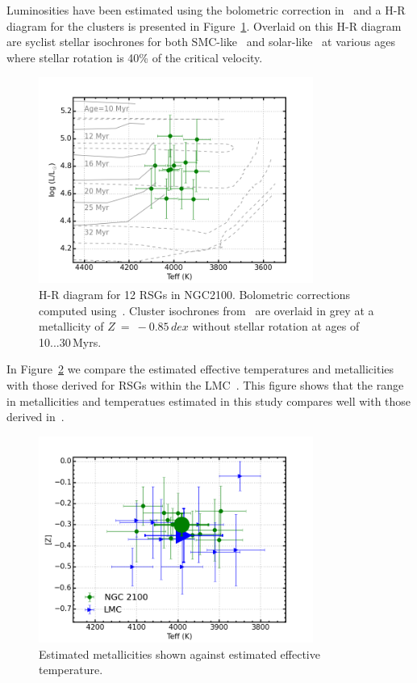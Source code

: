 \documentclass[useAMS,usenatbib]{mn2e}
\begin{document}
Luminosities have been estimated using the bolometric correction in~\cite{2013ApJ...767....3D} and a H-R diagram for the clusters is presented in Figure~\ref{fig:HRD}.
Overlaid on this H-R diagram are {\sc syclist} stellar isochrones for both SMC-like~\citep[solid lines][]{2013A&A...558A.103G} and solar-like~\citep[dashed lines][]{} at various ages where stellar rotation is 40\% of the critical velocity.



\begin{figure}
 \includegraphics[width=9.0cm]{NGC2100-HRD-iso}
 \caption{H-R diagram for 12 RSGs in NGC2100.
  Bolometric corrections computed using~\citet{2013ApJ...767....3D}.
  Cluster isochrones from~\citet{2013A&A...558A.103G} are overlaid in grey at a metallicity of $Z~=~-0.85\,dex$ without stellar rotation at ages of 10...30\,Myrs.
\label{fig:HRD}
          }
\end{figure}

In Figure~\ref{fig:TeffvsZ} we compare the estimated effective temperatures and metallicities with those derived for RSGs within the LMC~\citep{2015ApJ...806...21D}.
This figure shows that the range in metallicities and temperatues estimated in this study compares well with those derived in~\cite{2015ApJ...806...21D}.

\begin{figure}
 \includegraphics[width=9.0cm]{NGC2100-TeffvsZ-2100-LMC}
 \caption{Estimated metallicities shown against estimated effective temperature.
\label{fig:TeffvsZ}
          }
\end{figure}
\end{document}
